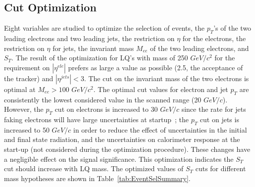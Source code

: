 \documentclass{cmspaper}
\begin{document}
\begin{linenumbers}
\begin{table}[htbp]
\begin{center}
\end{center}
\caption{\small \sl Number events expected from LQ signal and background samples after the analysis selection for 100 pb$^{-1}$ of data.
The cut value on the kinematic variable $S_T$ depends on the LQ mass, and it is indicated in the second column.
Data samples from FullSim Monte Carlo are used for all backgrounds and for LQ masses of 250 and 400 $GeV/c^2$. 
Signal samples marked by (*) are made with the FastSim Monte Carlo. } 
\label{tab:EventSelSummary}
\end{table}

\subsection{Cut Optimization} \label{sec:cutOptimization}

Eight variables are studied to optimize the selection of  events,
 the $p_T$'s of the two leading electrons and two leading jets, the 
restriction 
on $\eta$ for the electrons, the restriction on 
$\eta$ for jets, the invariant mass $M_{ee}$ of the two leading electrons, 
and  $S_T$.
The result of the optimization for LQ's with mass of 250 $GeV/c^2$ for
the requirement on $|\eta^{ele}|$ prefers as large a value as possible
(2.5, the acceptance of the tracker)
and $|\eta^{jets}|<3$. 
The cut on the invariant mass of the two electrons 
is optimal at  $M_{ee}>100$ $GeV/c^2$. The 
optimal cut values for electron and jet $p_T$ are consistently 
the lowest considered value in the scanned range 
(20 $GeV/c$). However, the $p_{T}$ cut on electrons is increased to 
30 $GeV/c$ since the rate for jets faking electrons will have
large uncertainties at startup~\cite{HEEPNOTE}; 
the $p_{T}$ cut on jets is increased to 50 $GeV/c$ in order to reduce the effect 
of uncertainties in the initial and final state radiation, and the uncertainties 
on calorimeter response at the start-up (not considered during the
optimization procedure).
These changes have a negligible effect on the signal significance. 
This optimization indicates the $S_T$ cut 
should increase with LQ mass. 
The optimized values of $S_{T}$ cuts for different mass hypotheses are shown in Table~\ref{tab:EventSelSummary}. 



\end{linenumbers}
\end{document}
